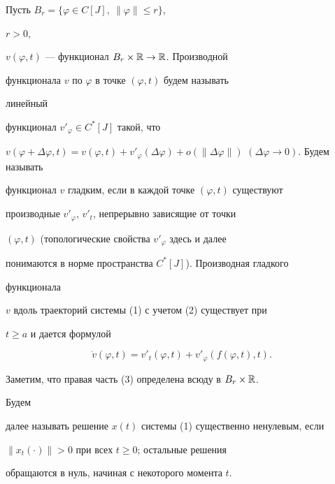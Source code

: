 Пусть $B_r=\{\varphi\in C[J],\ \|\varphi\|\leqslant r\}$,


$r>0$,


$v(\varphi,t)$ --- функционал $B_r\times\Bbb R\to\Bbb R$. Производной


функционала $v$ по $\varphi$ в точке $(\varphi,t)$ будем называть


линейный


функционал $v'_{\varphi}\in C^*[J]$ такой, что


$v(\varphi+\Delta\varphi,t)=v(\varphi,t)+v'_{\varphi}(\Delta\varphi)+


o(\|\Delta\varphi\|)$ $(\Delta\varphi\to 0)$. Будем называть


функционал $v$ гладким, если в каждой точке $(\varphi,t)$ существуют


производные $v'_{\varphi}$, $v'_t$, непрерывно зависящие от точки


$(\varphi, t)$ (топологические свойства $v'_{\varphi}$ здесь и далее


понимаются в норме пространства $C^*[J]$). Производная гладкого


функционала


$v$ вдоль траекторий системы (1) с учетом (2) существует при


$t\geqslant a$ и дается формулой


\begin{equation}


\Dot v(\varphi,t)=v'_t(\varphi,t)+v'_{\varphi}(f(\varphi,t),t).


\end{equation}


Заметим, что правая часть (3) определена всюду в $B_r\times\Bbb R$.


Будем


далее называть решение $x(t)$ системы (1) существенно ненулевым, если


$\| x_t(\cdot )\|>0$ при всех $t\geqslant 0$; остальные решения


обращаются в нуль, начиная с некоторого момента $t$.





